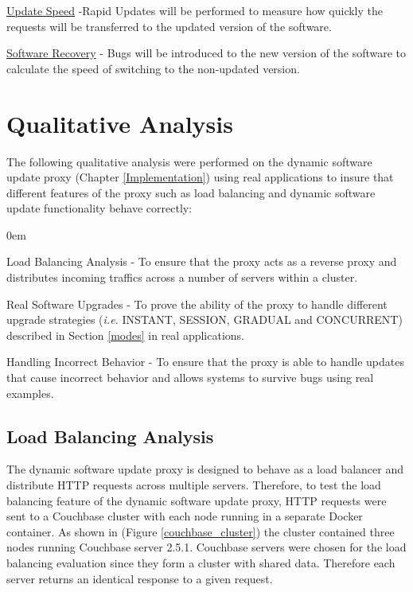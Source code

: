 \documentclass[a4paper,11pt,twoside]{report}
\begin{document}
\noindent
\underline{Update Speed} -Rapid Updates will be performed to measure how quickly the requests will be transferred to the updated version of the software. 

\noindent
\underline{Software Recovery} - Bugs will be introduced to the new version of the software to calculate the speed of switching to the non-updated version. 
 
\section{Qualitative Analysis}
The following qualitative analysis were performed on the dynamic software update proxy (Chapter \ref{Implementation}) using real applications to insure that different features of the proxy such as load balancing and dynamic software update functionality behave correctly:

\begin{list}{-}{}
  \itemsep0em
  \item{Load Balancing Analysis} - To ensure that the proxy acts as a reverse proxy and distributes incoming traffics across a number of servers within a cluster. 

  \item{Real Software Upgrades} - To prove the ability of the proxy to handle different upgrade strategies (\textit{i.e.} INSTANT, SESSION, GRADUAL and CONCURRENT) described in Section \ref{modes} in real applications. 
  
   \item{Handling Incorrect Behavior} - To ensure that the proxy is able to handle updates that cause incorrect behavior and allows systems to survive bugs using real examples. 
\end{list} 

\subsection{Load Balancing Analysis}
The dynamic software update proxy is designed to behave as a load balancer and distribute  HTTP requests across multiple servers. Therefore, to test the load balancing feature of the dynamic software update proxy, HTTP requests were sent to a Couchbase cluster with each node running in a separate Docker container. As shown in (Figure \ref{couchbase_cluster}) the cluster contained three nodes running Couchbase server 2.5.1.  Couchbase servers were chosen for the load balancing evaluation since they form a cluster with shared data. Therefore each server returns an identical response to a given request.
\end{document}
